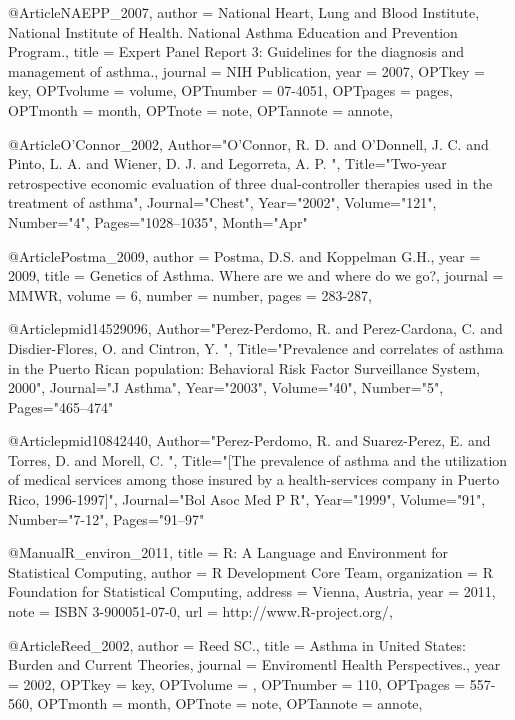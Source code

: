 {{{%

@Article{NAEPP_2007,
author = {National Heart, Lung and Blood Institute, National Institute of Health. National Asthma Education and Prevention Program.},
title = {Expert Panel Report 3: Guidelines for the diagnosis and management of asthma.},
journal = {NIH Publication},
year = {2007},
OPTkey = {key},
OPTvolume = {volume},
OPTnumber = {07-4051},
OPTpages = {pages},
OPTmonth = {month},
OPTnote = {note},
OPTannote = {annote},
}



@Article{O'Connor_2002,
   Author="O'Connor, R. D.  and O'Donnell, J. C.  and Pinto, L. A.  and Wiener, D. J.  and Legorreta, A. P. ",
   Title="{{T}wo-year retrospective economic evaluation of three dual-controller therapies used in the treatment of asthma}",
   Journal="Chest",
   Year="2002",
   Volume="121",
   Number="4",
   Pages="1028--1035",
   Month="Apr"
}


@Article{Postma_2009,
  author = {Postma, D.S. and Koppelman G.H.},
  year = {2009},
  title = {Genetics of Asthma. Where are we and where do we go?},
  journal = MMWR,
  volume =  {6},
  number = {number},
  pages = {283-287},
}


@Article{pmid14529096,
   Author="Perez-Perdomo, R.  and Perez-Cardona, C.  and Disdier-Flores, O.  and Cintron, Y. ",
   Title="{{P}revalence and correlates of asthma in the {P}uerto {R}ican population: {B}ehavioral {R}isk {F}actor {S}urveillance {S}ystem, 2000}",
   Journal="J Asthma",
   Year="2003",
   Volume="40",
   Number="5",
   Pages="465--474"
}

@Article{pmid10842440,
   Author="Perez-Perdomo, R.  and Suarez-Perez, E.  and Torres, D.  and Morell, C. ",
   Title="{[{T}he prevalence of asthma and the utilization of medical services among those insured by a health-services company in {P}uerto {R}ico, 1996-1997]}",
   Journal="Bol Asoc Med P R",
   Year="1999",
   Volume="91",
   Number="7-12",
   Pages="91--97"
}




@Manual{R_environ_2011,
    title = {R: A Language and Environment for Statistical Computing},
    author = {{R Development Core Team}},
    organization = {R Foundation for Statistical Computing},
    address = {Vienna, Austria},
    year = {2011},
    note = {{ISBN} 3-900051-07-0},
    url = {http://www.R-project.org/},
  }

@Article{Reed_2002,
author = {Reed SC.},
title = {Asthma in United States: Burden and Current Theories},
journal = {Enviromentl Health Perspectives.},
year = {2002},
OPTkey = {key},
OPTvolume = {},
OPTnumber = {110},
OPTpages = {557-560},
OPTmonth = {month},
OPTnote = {note},
OPTannote = {annote},
}


}}}
